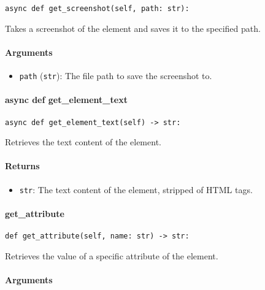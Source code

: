 \documentclass{article}
\begin{document}
\begin{lstlisting}[style=pythonstyle]
async def get_screenshot(self, path: str):
\end{lstlisting}

\noindent Takes a screenshot of the element and saves it to the specified path.

\paragraph{Arguments}

\begin{itemize}
    \item \lstinline[style=pythonstyle]|path| (\lstinline[style=pythonstyle]|str|): The file path to save the screenshot to.
\end{itemize}

\paragraph{async def get\_element\_text}

\begin{lstlisting}[style=pythonstyle]
async def get_element_text(self) -> str:
\end{lstlisting}

\noindent Retrieves the text content of the element.

\paragraph{Returns}

\begin{itemize}
    \item \lstinline[style=pythonstyle]|str|: The text content of the element, stripped of HTML tags.
\end{itemize}

\paragraph{get\_attribute}

\begin{lstlisting}[style=pythonstyle]
def get_attribute(self, name: str) -> str:
\end{lstlisting}

\noindent Retrieves the value of a specific attribute of the element.

\paragraph{Arguments}
\end{document}
